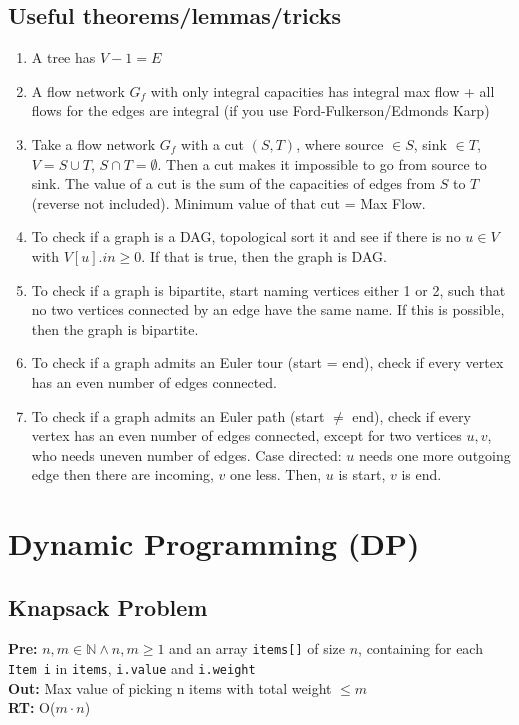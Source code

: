 \documentclass[a4paper,10pt]{article}
\begin{document}
\begin{multicols}{2}
\subsection{Useful theorems/lemmas/tricks}
\begin{enumerate}
\itemsep0em
\item A tree has $V-1=E$
\item A flow network $G_f$ with only integral capacities has integral max flow + all flows for the edges are integral (if you use Ford-Fulkerson/Edmonds Karp)
\item Take a flow network $G_f$ with a cut $(S,T)$, where source $\in S$, sink $\in T$, $V=S\cup T$, $S\cap T=\emptyset$. Then a cut makes it impossible to go from source to sink. The value of a cut is the sum of the capacities of edges from $S$ to $T$(reverse not included). Minimum value of that cut = Max Flow.
\item To check if a graph is a DAG, topological sort it and see if there is no $u\in V$ with $V[u].in\geq 0$. If that is true, then the graph is DAG.
\item To check if a graph is bipartite, start naming vertices either 1 or 2, such that no two vertices connected by an edge have the same name. If this is possible, then the graph is bipartite.
\item To check if a graph admits an Euler tour (start = end), check if every vertex has an even number of edges connected.
\item To check if a graph admits an Euler path (start $\neq$ end), check if every vertex has an even number of edges connected, except for two vertices $u,v$, who needs uneven number of edges. Case directed: $u$ needs one more outgoing edge then there are incoming, $v$ one less. Then, $u$ is start, $v$ is end.
\end{enumerate}

\section{Dynamic Programming (DP)}\label{sec:dp}
\subsection{Knapsack Problem}
\textbf{Pre:} $n,m\in\mathbb{N}\land n,m\geq1$ and an array \lstinline|items[]| of size $n$, containing for each \lstinline|Item i| in \lstinline|items|, \lstinline|i.value| and \lstinline|i.weight| \\
\textbf{Out:} Max value of picking n items with total weight $\leq m$\\
\textbf{RT:} O($m\cdot n$)



\end{multicols}
\end{document}
